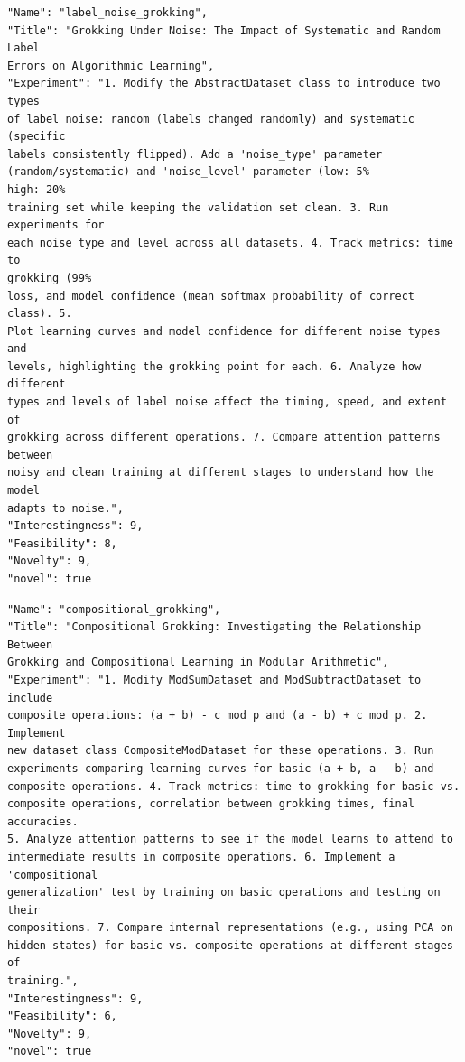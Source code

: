 \documentclass[11pt, a4paper]{include/gdm_format}
\begin{document}
\begin{tcolorbox}[breakable,colback=blue!5!white, colframe=blue!75!black, title=Idea 13/50 - \texttt{label\_noise\_grokking}]
\small
\begin{verbatim}
"Name": "label_noise_grokking",
"Title": "Grokking Under Noise: The Impact of Systematic and Random Label
Errors on Algorithmic Learning",
"Experiment": "1. Modify the AbstractDataset class to introduce two types
of label noise: random (labels changed randomly) and systematic (specific
labels consistently flipped). Add a 'noise_type' parameter
(random/systematic) and 'noise_level' parameter (low: 5%
high: 20%
training set while keeping the validation set clean. 3. Run experiments for
each noise type and level across all datasets. 4. Track metrics: time to
grokking (99%
loss, and model confidence (mean softmax probability of correct class). 5.
Plot learning curves and model confidence for different noise types and
levels, highlighting the grokking point for each. 6. Analyze how different
types and levels of label noise affect the timing, speed, and extent of
grokking across different operations. 7. Compare attention patterns between
noisy and clean training at different stages to understand how the model
adapts to noise.",
"Interestingness": 9,
"Feasibility": 8,
"Novelty": 9,
"novel": true
\end{verbatim}
\end{tcolorbox}

\begin{tcolorbox}[breakable,colback=blue!5!white, colframe=blue!75!black, title=Idea 14/50 - \texttt{compositional\_grokking}]
\small
\begin{verbatim}
"Name": "compositional_grokking",
"Title": "Compositional Grokking: Investigating the Relationship Between
Grokking and Compositional Learning in Modular Arithmetic",
"Experiment": "1. Modify ModSumDataset and ModSubtractDataset to include
composite operations: (a + b) - c mod p and (a - b) + c mod p. 2. Implement
new dataset class CompositeModDataset for these operations. 3. Run
experiments comparing learning curves for basic (a + b, a - b) and
composite operations. 4. Track metrics: time to grokking for basic vs.
composite operations, correlation between grokking times, final accuracies.
5. Analyze attention patterns to see if the model learns to attend to
intermediate results in composite operations. 6. Implement a 'compositional
generalization' test by training on basic operations and testing on their
compositions. 7. Compare internal representations (e.g., using PCA on
hidden states) for basic vs. composite operations at different stages of
training.",
"Interestingness": 9,
"Feasibility": 6,
"Novelty": 9,
"novel": true
\end{verbatim}
\end{tcolorbox}
\end{document}
